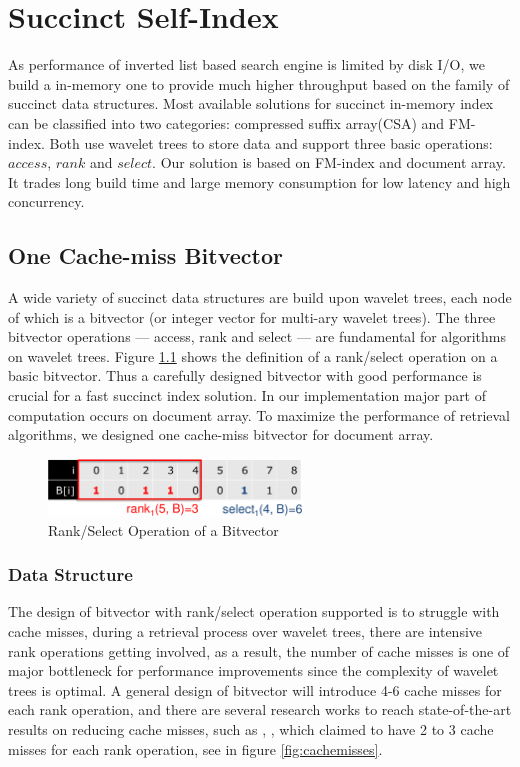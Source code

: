 \chapter{Succinct Self-Index}

As performance of inverted list based search engine is limited by disk I/O, we build a in-memory one to provide much higher throughput based on the family of
succinct data structures. Most available solutions for succinct in-memory index can be classified into two categories: compressed suffix array(CSA) and FM-index.
Both use wavelet trees to store data and support three basic operations: \(access\), \(rank\) and \(select\). Our solution is based on FM-index and document array. It
trades long build time and large memory consumption for low latency and high concurrency.


\section{One Cache-miss Bitvector}

A wide variety of succinct data structures are build upon wavelet trees, each node of which is a bitvector (or integer vector for multi-ary wavelet trees). The three bitvector
operations --- access, rank and select --- are fundamental for algorithms on wavelet trees. Figure \ref{fig:rankselect} shows the definition of a rank/select operation
on a basic bitvector. Thus a carefully designed bitvector with good performance is crucial for a fast succinct index solution. In our implementation major part of computation
occurs on document array. To maximize the performance of retrieval algorithms, we designed one cache-miss bitvector for document array.

\begin{figure}[h!]
\centerline{\includegraphics[width=0.6\textwidth]{Figures/rankselect.png}}
\caption{Rank/Select Operation of a Bitvector}\label{fig:rankselect}
\end{figure}


\subsection{Data Structure}
The design of bitvector with rank/select operation supported is to struggle with cache misses, during a retrieval process over wavelet trees, there are intensive rank operations
getting involved, as a result, the number of cache misses is one of major bottleneck for performance improvements since the complexity of wavelet trees is optimal. A general
design of bitvector will introduce 4-6 cache misses for each rank operation, and there are several research works to reach state-of-the-art results on reducing cache misses,
such as \cite{gog2013optimized}, \cite{zhou2013space}, which claimed to have 2 to 3 cache misses for each rank operation, see in figure \ref{fig:cachemisses}.

